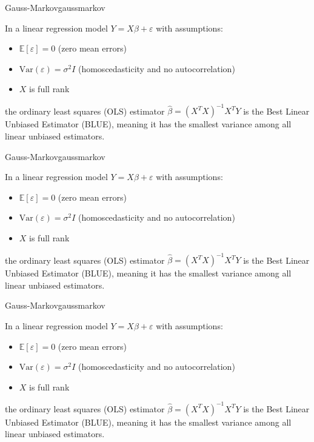 \begin{method}{Gauss-Markov}{gaussmarkov}

    In a linear regression model $Y = X\beta + \varepsilon$ with assumptions:
\begin{itemize}
    \item $\mathbb{E}[\varepsilon] = 0$ (zero mean errors)
    \item $\text{Var}(\varepsilon) = \sigma^2 I$ (homoscedasticity and no autocorrelation)
    \item $X$ is full rank
\end{itemize}
the ordinary least squares (OLS) estimator $\hat{\beta} = (X^TX)^{-1}X^TY$ 
is the Best Linear Unbiased Estimator (BLUE), meaning it has the smallest 
variance among all linear unbiased estimators.
    
\end{method}

\begin{example}{Gauss-Markov}{gaussmarkov}

In a linear regression model $Y = X\beta + \varepsilon$ with assumptions:
\begin{itemize}
    \item $\mathbb{E}[\varepsilon] = 0$ (zero mean errors)
    \item $\text{Var}(\varepsilon) = \sigma^2 I$ (homoscedasticity and no autocorrelation)
    \item $X$ is full rank
\end{itemize}
the ordinary least squares (OLS) estimator $\hat{\beta} = (X^TX)^{-1}X^TY$ 
is the Best Linear Unbiased Estimator (BLUE), meaning it has the smallest 
variance among all linear unbiased estimators.

\end{example}

\begin{highlight}{Gauss-Markov}{gaussmarkov}

In a linear regression model $Y = X\beta + \varepsilon$ with assumptions:
\begin{itemize}
    \item $\mathbb{E}[\varepsilon] = 0$ (zero mean errors)
    \item $\text{Var}(\varepsilon) = \sigma^2 I$ (homoscedasticity and no autocorrelation)
    \item $X$ is full rank
\end{itemize}
the ordinary least squares (OLS) estimator $\hat{\beta} = (X^TX)^{-1}X^TY$ 
is the Best Linear Unbiased Estimator (BLUE), meaning it has the smallest 
variance among all linear unbiased estimators.

\end{highlight}


